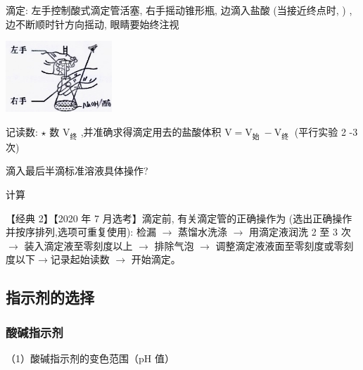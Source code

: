 \documentclass[10pt,cn]{elegantbook}
\begin{document}
		滴定: 左手控制酸式滴定管活塞, 右手摇动锥形瓶, 边滴入盐酸 (当接近终点时, ) , 边不断顺时针方向摇动, 眼睛要始终注视
	
	\begin{center}
		\includegraphics[max width=0.3\textwidth]{image/c4-2.jpg}
	\end{center}
	
	记读数: $\star$ 数 \({\mathrm{V}}_{\text{终}}\) ,并准确求得滴定用去的盐酸体积 \(\mathrm{V} = {\mathrm{V}}_{\text{始 }} - {\mathrm{V}}_{\text{终 }}\) (平行实验 2 -3 次) 
	
	滴入最后半滴标准溶液具体操作?
	
	计算
	
	【经典 2】【2020 年 7 月选考】滴定前, 有关滴定管的正确操作为 (选出正确操作并按序排列,选项可重复使用): 检漏 \(\rightarrow\) 蒸馏水洗涤 \(\rightarrow\) 用滴定液润洗 2 至 3 次 \(\rightarrow\) 装入滴定液至零刻度以上 \(\rightarrow\) 排除气泡 \(\rightarrow\) 调整滴定液液面至零刻度或零刻度以下\( \rightarrow \)记录起始读数 \(\rightarrow\) 开始滴定。
	
	
\subsection{指示剂的选择}

\subsubsection{酸碱指示剂}

（1）酸碱指示剂的变色范围（pH 值） 

\begin{center}
\end{center}
\end{document}
